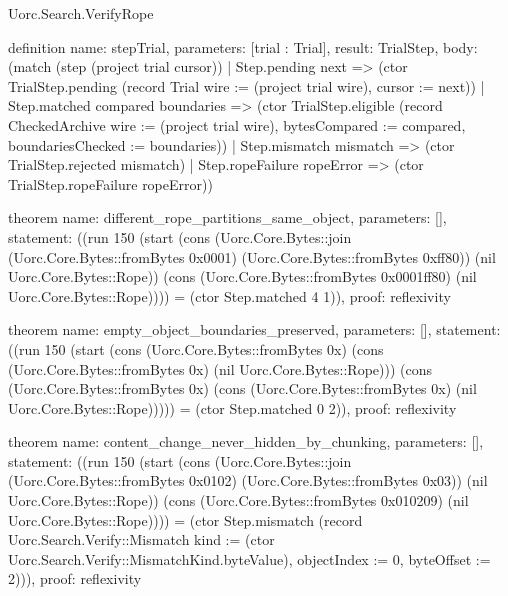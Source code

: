 \begin{lexlean}{Uorc.Search.VerifyRope}
\begin{semanticmodule}
definition{
  name: stepTrial,
  parameters: [trial : Trial],
  result: TrialStep,
  body: (match (step (project trial cursor))
    | Step.pending next => (ctor TrialStep.pending (record Trial {wire := (project trial wire), cursor := next}))
    | Step.matched compared boundaries => (ctor TrialStep.eligible (record CheckedArchive {wire := (project trial wire), bytesCompared := compared, boundariesChecked := boundaries}))
    | Step.mismatch mismatch => (ctor TrialStep.rejected mismatch)
    | Step.ropeFailure ropeError => (ctor TrialStep.ropeFailure ropeError))
}

theorem{
  name: different_rope_partitions_same_object,
  parameters: [],
  statement: ((run 150 (start (cons (Uorc.Core.Bytes::join (Uorc.Core.Bytes::fromBytes 0x0001) (Uorc.Core.Bytes::fromBytes 0xff80)) (nil Uorc.Core.Bytes::Rope)) (cons (Uorc.Core.Bytes::fromBytes 0x0001ff80) (nil Uorc.Core.Bytes::Rope)))) = (ctor Step.matched 4 1)),
  proof: reflexivity{}
}

theorem{
  name: empty_object_boundaries_preserved,
  parameters: [],
  statement: ((run 150 (start (cons (Uorc.Core.Bytes::fromBytes 0x) (cons (Uorc.Core.Bytes::fromBytes 0x) (nil Uorc.Core.Bytes::Rope))) (cons (Uorc.Core.Bytes::fromBytes 0x) (cons (Uorc.Core.Bytes::fromBytes 0x) (nil Uorc.Core.Bytes::Rope))))) = (ctor Step.matched 0 2)),
  proof: reflexivity{}
}

theorem{
  name: content_change_never_hidden_by_chunking,
  parameters: [],
  statement: ((run 150 (start (cons (Uorc.Core.Bytes::join (Uorc.Core.Bytes::fromBytes 0x0102) (Uorc.Core.Bytes::fromBytes 0x03)) (nil Uorc.Core.Bytes::Rope)) (cons (Uorc.Core.Bytes::fromBytes 0x010209) (nil Uorc.Core.Bytes::Rope)))) = (ctor Step.mismatch (record Uorc.Search.Verify::Mismatch {kind := (ctor Uorc.Search.Verify::MismatchKind.byteValue), objectIndex := 0, byteOffset := 2}))),
  proof: reflexivity{}
}
\end{semanticmodule}
\end{lexlean}
